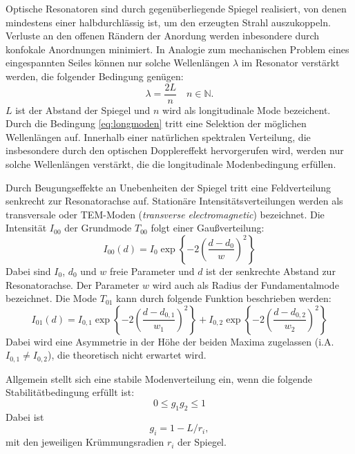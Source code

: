 Optische Resonatoren sind durch gegenüberliegende Spiegel realisiert, von denen mindestens einer halbdurchlässig ist, um den erzeugten Strahl
auszukoppeln. Verluste an den offenen Rändern der Anordung werden inbesondere durch konfokale Anordnungen minimiert.
In Analogie zum mechanischen Problem eines eingespannten Seiles können nur solche Wellenlängen $\lambda$
im Resonator verstärkt werden, die
folgender Bedingung genügen:
\begin{equation}
	  \lambda = \frac{2 L }{n} \quad n \in  \mathbb{N}.
	    \label{eq:longmoden}
\end{equation}
$L$ ist der Abstand der Spiegel und $n$ wird als longitudinale Mode bezeichent.
Durch die Bedingung \eqref{eq:longmoden} tritt eine Selektion der möglichen Wellenlängen auf. Innerhalb
einer natürlichen spektralen Verteilung, die insbesondere durch den optischen Dopplereffekt hervorgerufen wird, werden nur solche Wellenlängen
verstärkt, die die longitudinale Modenbedingung erfüllen.

Durch Beugungseffekte an Unebenheiten der Spiegel tritt eine Feldverteilung senkrecht zur Resonatorachse auf. Stationäre Intensitätsverteilungen
werden als transversale oder TEM-Moden (\textit{transverse electromagnetic}) bezeichnet. Die Intensität $I_{00}$ der Grundmode $T_{00}$ folgt einer Gaußverteilung:
\begin{equation}
	  I_{00}(d) = I_{0}\exp\left\{- 2\left(\frac{d-d_0}{w}\right)^2\right\}
	    \label{eq: tem00}
\end{equation}
Dabei sind $I_{0}$, $d_0$ und $w$ freie Parameter und $d$ ist der senkrechte Abstand zur
Resonatorachse. Der Parameter $w$ wird auch als Radius
der Fundamentalmode bezeichnet. Die Mode $T_{01}$ kann durch folgende Funktion beschrieben
werden:
\begin{equation} %
	  I_{01}(d) = I_{0, 1}\exp\left\{- 2\left(\frac{d-d_{0, 1}}{w_{1}}\right)^2\right\} + I_{0, 2}\exp\left\{- 2\left(\frac{d-d_{0,2}}{w_{2}}\right)^2\right\}
	    \label{eq:tem01}
\end{equation}
Dabei wird eine Asymmetrie in der Höhe der beiden Maxima zugelassen (i.A. $I_{0, 1} \neq I_{0, 2}$), die theoretisch nicht
erwartet wird.

Allgemein stellt sich eine stabile Modenverteilung
ein, wenn die folgende Stabilitätbedingung erfüllt ist:
\begin{equation}
	  0 \leq g_1 g_2 \leq 1
	    \label{eq:stabilität}
\end{equation}
Dabei ist
\begin{equation}
	  g_{i} = 1 - L/r_{i}, 
	    \label{eq:spiegelparameter}
\end{equation}
mit den jeweiligen Krümmungsradien $r_{i}$ der Spiegel. 

